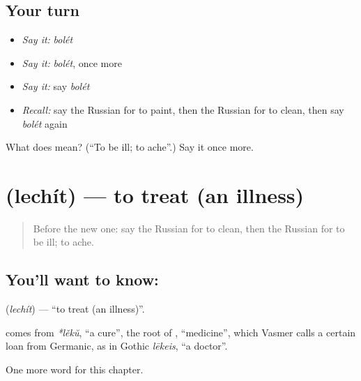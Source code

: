 \subsection*{Your turn}
\begin{itemize}
\raggedright
  \item \emph{Say it:} \emph{bolét}
  \item \emph{Say it:} \emph{bolét}, once more
  \item \emph{Say it:} say \emph{bolét}
  \item \emph{Recall:} say the Russian for to paint, then the Russian for to clean, then say \emph{bolét} again
\end{itemize}

\begin{tcolorbox}[breakable,colback=teal!4,colframe=teal!35!black,title={Before you move on}]
What does  mean? (\textquotedblleft{}To be ill; to ache\textquotedblright{}.) Say it once more.
\end{tcolorbox}
\section[\texorpdfstring{\ru{лечить} (lechít)}{лечить (lechít)}]{ (lechít) — to treat (an illness)}

\label{lesson:RU-C207-lechit}



\begin{quote}
Before the new one: say the Russian for to clean, then the Russian for to be ill; to ache.
\end{quote}

\subsection*{You'll want to know: }
\textbf{} (\emph{lechít}) — \textquotedblleft{}to treat (an illness)\textquotedblright{}.

\begin{cousinweb}
\textbf{} comes from \emph{*lěkŭ}, \textquotedblleft{}a cure\textquotedblright{}, the root of \emph{}, \textquotedblleft{}medicine\textquotedblright{}, which Vasmer calls a certain loan from Germanic, as in Gothic \emph{lēkeis}, \textquotedblleft{}a doctor\textquotedblright{}.
\end{cousinweb}

\begin{grammarlens}[title={What you've built}]
One more word for this chapter.
\end{grammarlens}

